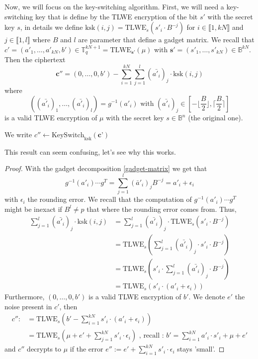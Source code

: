 \documentclass{article}
\newcommand{\T}{\mathbb{T}}
\newcommand{\B}{\mathbb{B}}
\theoremstyle{definition}
\theoremstyle{Theorem}
\begin{document}
Now, we will focus on the key-switching algorithm. First, we will need a key-switching key that is define by the TLWE encryption of the bit $s'$ with the secret key $s$, in details we define $\text{ksk}(i,j) = \text{TLWE}_s(s'_i\cdot B^{-j})$ for $i\in\llbracket 1, kN \rrbracket$ and $j\in\llbracket 1,l\rrbracket$ where $B$ and $l$ are parameter that define a gadget matrix. We recall that $c' = (a'_1,\ldots,a'_{kN},b')\in\T_q^{kN+1} = \text{TLWE}_{\mathbf{s'}}(\mu)$ with $\mathbf{s'} = (s'_1,\ldots,s'_{kN})\in\B^{kN}$. Then the ciphertext 
$$\mathbf{c''}=(0,\ldots,0,b') - \sum_{i=1}^{kN}\sum_{j=1}^{l} (\bar{a'_i})_j \cdot \text{ksk}(i,j)$$
where
$$((\bar{a'_i})_1,\ldots,(\bar{a'_i})_l)=g^{-1}(a'_i) \text{ with } (\bar{a'_i})_j \in [-\Big\lfloor\frac{B}{2}\Big\rfloor, \Big\lceil\frac{B}{2}\Big\rceil]$$
is a valid TLWE encryption of $\mu$ with the secret key $s\in\B^n$ (the original one).

We write $c''\gets\text{KeySwitch}_{\text{ksk}}(\textbf{c'})$

This result can seem confusing, let's see why this works. 
\begin{proof}
    With the gadget decomposition \ref{gadget-matrix} we get that 
    $$g^{-1}(a'_i)\cdots g^T = \sum_{j=1}^{l} (\bar{a}'_i)_j B^{-j} = a'_i + \epsilon_i$$
    with $\epsilon_i$ the rounding error. We recall that the computation of $g^{-1}(a'_i)\cdots g^T$ might be inexact if $B^l \neq p$ that where the rounding error comes from. Thus,
    \begin{equation}
    \begin{split}
        \sum_{j=1}^l (\bar{a'_i})_j \cdot \text{ksk}(i,j) &= \sum_{j=1}^l (\bar{a'_i})_j \cdot \text{TLWE}_s(s'_i\cdot B^{-j})\\
        &= \text{TLWE}_s( \sum_{j=1}^l (\bar{a'_i})_j \cdot s'_i\cdot B^{-j})\\
        &= \text{TLWE}_s( s'_i\cdot\sum_{j=1}^l (\bar{a'_i})_j \cdot  B^{-j})\\
        &= \text{TLWE}_s( s'_i\cdot (a'_i + \epsilon_i))
    \end{split}
    \end{equation}
    Furthermore, $(0,\ldots,0,b')$ is a valid TLWE encryption of $b'$. We denote $e'$ the noise present in $c'$, then 
    \begin{equation}
    \begin{split}
        c'' :&= \text{TLWE}_s(b' - \sum_{i=1}^{kN} s'_i\cdot(a'_i + \epsilon_i))\\
        &= \text{TLWE}_s(\mu + e' + \sum_{j=1}^{kN} s'_i \cdot \epsilon_i) \text{ , recall : } b' = \sum_{i=1}^{kN} a'_i\cdot s'_i + \mu + e'
    \end{split}
    \end{equation}
    and $c''$ decrypts to $\mu$ if the error $e'' := e' + \sum_{i=1}^{kN} s'_i\cdot \epsilon_i$ stays 'small'.
\end{proof}
\end{document}
